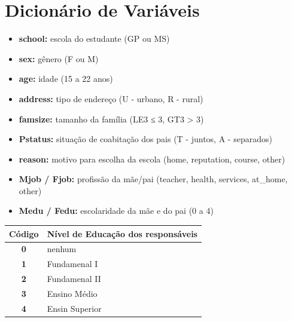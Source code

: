 \documentclass[
  letterpaper,
  DIV=11,
  numbers=noendperiod,
  openany]{scrreprt}
\providecommand{\tightlist}{%
  \setlength{\itemsep}{0pt}\setlength{\parskip}{0pt}}
\begin{document}
\section{Dicionário de Variáveis}\label{dicionuxe1rio-de-variuxe1veis}

\begin{itemize}
\tightlist
\item
  \textbf{school:} escola do estudante (GP ou MS)
\item
  \textbf{sex:} gênero (F ou M)
\item
  \textbf{age:} idade (15 a 22 anos)
\item
  \textbf{address:} tipo de endereço (U - urbano, R - rural)
\item
  \textbf{famsize:} tamanho da família (LE3 ≤ 3, GT3 \textgreater{} 3)
\item
  \textbf{Pstatus:} situação de coabitação dos pais (T - juntos, A -
  separados)
\item
  \textbf{reason:} motivo para escolha da escola (home, reputation,
  course, other)
\item
  \textbf{Mjob / Fjob:} profissão da mãe/pai (teacher, health, services,
  at\_home, other)
\item
  \textbf{Medu / Fedu:} escolaridade da mãe e do pai (0 a 4)
\end{itemize}

\begin{longtable}[]{@{}cl@{}}
\toprule\noalign{}
Código & Nível de Educação dos responsáveis \\
\midrule\noalign{}
\endhead
\bottomrule\noalign{}
\endlastfoot
\textbf{0} & nenhum \\
\textbf{1} & Fundamenal I \\
\textbf{2} & Fundamenal II \\
\textbf{3} & Ensino Médio \\
\textbf{4} & Ensin Superior \\
\end{longtable}
\end{document}
